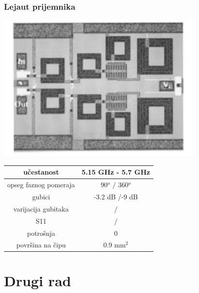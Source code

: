 \documentclass{beamer}
\begin{document}
\begin{frame}
  \frametitle{Lejaut prijemnika}
  \includegraphics[width=0.7\linewidth]{layout_ellinger.png}
\end{frame}



\begin{frame}

\begin{center}
\begin{tabular}{ | c | c | }
  \hline
  učestanost & 5.15 GHz - 5.7 GHz \\
  \hline 
  opseg faznog pomeraja & 90$^o$ $/$ 360$^o$   \\  
  \hline
  gubici & -3.2 dB $/$-9 dB \\
  \hline
  varijacija gubitaka & $/$ \\
  \hline
  S11 & $/$ \\
  \hline
  potrošnja & 0 \\
  \hline
  površina na čipu & 0.9 mm$^2$  \\  
  \hline
\end{tabular}
\end{center}
\end{frame}

\section{Drugi rad}

  
\end{document}

